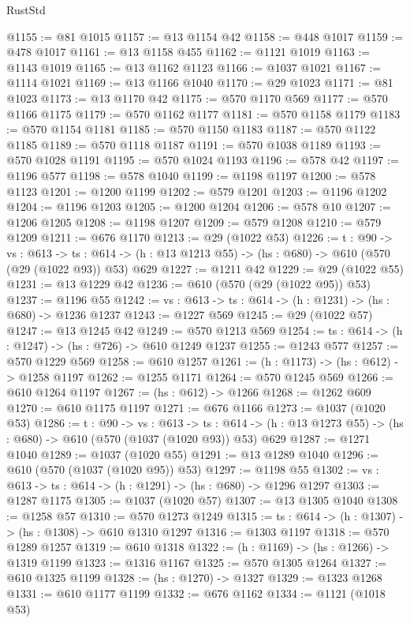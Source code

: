 \begin{lexlean}{RustStd}
\begin{coremodule}
@1155 := @81 @1015
@1157 := @13 @1154 @42
@1158 := @448 @1017
@1159 := @478 @1017
@1161 := @13 @1158 @455
@1162 := @1121 @1019
@1163 := @1143 @1019
@1165 := @13 @1162 @1123
@1166 := @1037 @1021
@1167 := @1114 @1021
@1169 := @13 @1166 @1040
@1170 := @29 @1023
@1171 := @81 @1023
@1173 := @13 @1170 @42
@1175 := @570 @1170 @569
@1177 := @570 @1166 @1175
@1179 := @570 @1162 @1177
@1181 := @570 @1158 @1179
@1183 := @570 @1154 @1181
@1185 := @570 @1150 @1183
@1187 := @570 @1122 @1185
@1189 := @570 @1118 @1187
@1191 := @570 @1038 @1189
@1193 := @570 @1028 @1191
@1195 := @570 @1024 @1193
@1196 := @578 @42
@1197 := @1196 @577
@1198 := @578 @1040
@1199 := @1198 @1197
@1200 := @578 @1123
@1201 := @1200 @1199
@1202 := @579 @1201
@1203 := @1196 @1202
@1204 := @1196 @1203
@1205 := @1200 @1204
@1206 := @578 @10
@1207 := @1206 @1205
@1208 := @1198 @1207
@1209 := @579 @1208
@1210 := @579 @1209
@1211 := @676 @1170
@1213 := @29 (@1022 @53)
@1226 := {t : @90} ->
  {vs : @613} ->
  {ts : @614} -> (h : @13 @1213 @55) -> (hs : @680) -> @610 (@570 (@29 (@1022 @93)) @53) @629
@1227 := @1211 @42
@1229 := @29 (@1022 @55)
@1231 := @13 @1229 @42
@1236 := @610 (@570 (@29 (@1022 @95)) @53)
@1237 := @1196 @55
@1242 := {vs : @613} -> {ts : @614} -> (h : @1231) -> (hs : @680) -> @1236 @1237
@1243 := @1227 @569
@1245 := @29 (@1022 @57)
@1247 := @13 @1245 @42
@1249 := @570 @1213 @569
@1254 := {ts : @614} -> (h : @1247) -> (hs : @726) -> @610 @1249 @1237
@1255 := @1243 @577
@1257 := @570 @1229 @569
@1258 := @610 @1257
@1261 := (h : @1173) -> (hs : @612) -> @1258 @1197
@1262 := @1255 @1171
@1264 := @570 @1245 @569
@1266 := @610 @1264 @1197
@1267 := (hs : @612) -> @1266
@1268 := @1262 @609
@1270 := @610 @1175 @1197
@1271 := @676 @1166
@1273 := @1037 (@1020 @53)
@1286 := {t : @90} ->
  {vs : @613} ->
  {ts : @614} -> (h : @13 @1273 @55) -> (hs : @680) -> @610 (@570 (@1037 (@1020 @93)) @53) @629
@1287 := @1271 @1040
@1289 := @1037 (@1020 @55)
@1291 := @13 @1289 @1040
@1296 := @610 (@570 (@1037 (@1020 @95)) @53)
@1297 := @1198 @55
@1302 := {vs : @613} -> {ts : @614} -> (h : @1291) -> (hs : @680) -> @1296 @1297
@1303 := @1287 @1175
@1305 := @1037 (@1020 @57)
@1307 := @13 @1305 @1040
@1308 := @1258 @57
@1310 := @570 @1273 @1249
@1315 := {ts : @614} -> (h : @1307) -> (hs : @1308) -> @610 @1310 @1297
@1316 := @1303 @1197
@1318 := @570 @1289 @1257
@1319 := @610 @1318
@1322 := (h : @1169) -> (hs : @1266) -> @1319 @1199
@1323 := @1316 @1167
@1325 := @570 @1305 @1264
@1327 := @610 @1325 @1199
@1328 := (hs : @1270) -> @1327
@1329 := @1323 @1268
@1331 := @610 @1177 @1199
@1332 := @676 @1162
@1334 := @1121 (@1018 @53)

\end{coremodule}
\end{lexlean}
